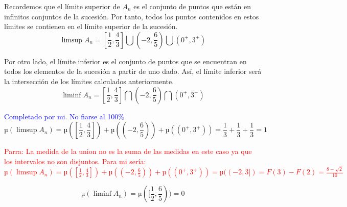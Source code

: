 \begin{problem}
Recordemos que el límite superior de $A_n$ es el conjunto de puntos que están en infinitos conjuntos de la sucesión. Por tanto, todos los puntos contenidos en estos límites se contienen en el límite superior de la sucesión.
\[\limsup A_n = [\frac{1}{2}, \frac{4}{3}] \bigcup  (-2, \frac{6}{5}) \bigcup (0^+, 3^+)\]

Por otro lado, el límite inferior es el conjunto de puntos que se encuentran en todos los elementos de la sucesión a partir de uno dado. Así, el límite inferior será la intersección de los límites calculados anteriormente.
\[\liminf A_n = [\frac{1}{2}, \frac{4}{3}] \bigcap  (-2, \frac{6}{5}) \bigcap (0^+, 3^+)\]

\textcolor{blue}{Completado por mi. No fiarse al 100\%}
\[µ(\limsup A_n) = µ([\frac{1}{2}, \frac{4}{3}]) +  µ((-2, \frac{6}{5})) +µ((0^+, 3^+)) = \frac{1}{3}  + \frac{1}{3} + \frac{1}{3} = 1\]

\textcolor{red}{Parra: La medida de la union no es la suma de las medidas en este caso ya que los intervalos no son disjuntos. Para mi sería:
$µ(\limsup A_n) = µ([\frac{1}{2}, \frac{4}{3}]) +  µ((-2, \frac{6}{5})) +µ((0^+, 3^+)) = µ((-2, 3]) = F(3) - F(2) = \frac{8-\sqrt{2}}{10}$}



\[µ(\liminf A_n) = µ([\frac{1}{2}, \frac{6}{5})) = 0\]

\end{problem}

